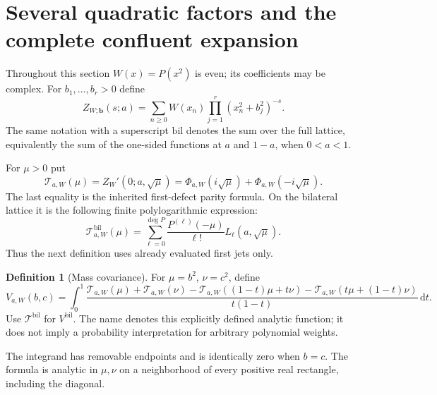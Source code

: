 \documentclass[11pt]{article}
\numberwithin{equation}{section}
\theoremstyle{definition}\newtheorem{definition}[theorem]{Definition}
\theoremstyle{remark}\newtheorem{remark}[theorem]{Remark}
\newcommand{\dd}{\,\mathrm d}
\begin{document}
\section{Several quadratic factors and the complete confluent expansion}
\label{hsd:sec:masses}
Throughout this section $W(x)=P(x^2)$ is even; its coefficients may be
complex. For $b_1,\ldots,b_r>0$ define
\begin{equation}\label{hsd:eq:manyZ}
 Z_{W;\mathbf b}(s;a)=\sum_{n\ge0}W(x_n)
                  \prod_{j=1}^r(x_n^2+b_j^2)^{-s}.
\end{equation}
The same notation with a superscript $\mathrm{bil}$ denotes the sum over
the full lattice, equivalently the sum of the one-sided functions at
$a$ and $1-a$, when $0<a<1$.

For $\mu>0$ put
\begin{equation}\label{hsd:eq:Tmu}
 \mathcal T_{a,W}(\mu)=Z_W'(0;a,\sqrt\mu)
        =\Phi_{a,W}(i\sqrt\mu)+\Phi_{a,W}(-i\sqrt\mu).
\end{equation}
The last equality is the inherited first-defect parity formula.
On the bilateral lattice it is the following finite polylogarithmic
expression:
\begin{equation}\label{hsd:eq:Tbil}
 \mathcal T_{a,W}^{\mathrm{bil}}(\mu)
       =\sum_{\ell=0}^{\deg P}\frac{P^{(\ell)}(-\mu)}{\ell!}
                                  L_\ell(a,\sqrt\mu).
\end{equation}
Thus the next definition uses already evaluated first jets only.

\begin{definition}[Mass covariance]\label{hsd:def:V}
For $\mu=b^2$, $\nu=c^2$, define
\begin{equation}\label{hsd:eq:Vmass}
 V_{a,W}(b,c)=\int_0^1
 \frac{\mathcal T_{a,W}(\mu)+\mathcal T_{a,W}(\nu)
 -\mathcal T_{a,W}((1-t)\mu+t\nu)
 -\mathcal T_{a,W}(t\mu+(1-t)\nu)}{t(1-t)}\dd t.
\end{equation}
Use $\mathcal T^{\mathrm{bil}}$ for $V^{\mathrm{bil}}$.
The name denotes this explicitly defined analytic function; it does not
imply a probability interpretation for arbitrary polynomial weights.
\end{definition}

The integrand has removable endpoints and is identically zero when
$b=c$. The formula is analytic in $\mu,\nu$ on a neighborhood of every
positive real rectangle, including the diagonal.
\end{document}
